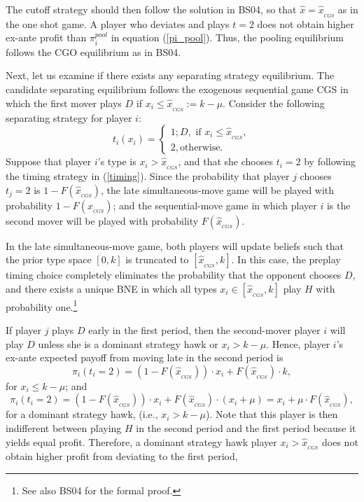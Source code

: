 \documentclass[12pt, letterpaper]{article}
\theoremstyle{plain}
\begin{document}
The cutoff strategy should then follow the solution in BS04, so that $\hat{x}=\hat{x}_{_{CG0}}$ as in the one shot game. A player who deviates and plays $t=2$ does not obtain higher ex-ante profit than $\pi^{pool}_{i}$  in equation (\ref{pi_pool}). Thus, the pooling equilibrium follows the CGO equilibrium as in BS04. 

Next, let us examine if there exists any separating strategy equilibrium. The candidate separating equilibrium follows the exogenous sequential game CGS in which the first mover plays $D$ if $x_i\leq \hat{x}_{_{CGS}}:= k-\mu$. Consider the following separating strategy for player $i $:
\begin{equation}
 t_i(x_i)=
 \begin{cases} 1; D, \mbox{ if } x_i  \leq \hat{x}_{_{CGS}}, \\
 2,  \text{otherwise}.
 \end{cases}
 \label{timing}
\end{equation}
Suppose that player $i$'s type is $x_i >\hat{x}_{_{CGS}}$, and that she chooses $t_i=2$ by following the timing strategy  in (\ref{timing}).  Since the probability that player $j$ chooses $t_j=2$ is $1-F(\hat{x}_{_{CGS}})$, the late simultaneous-move game will be played with probability $1-F(\hat{x}_{_{CGS}})$; and the sequential-move game in which player $i$ is the second mover will be played with probability $F(\hat{x}_{_{CGS}})$.

In the late simultaneous-move game, both players will update beliefs such that the prior type space $[0, k]$ is truncated to $[\hat{x}_{_{CGS}},k]$. In this case, the preplay timing choice completely eliminates the probability that the opponent chooses $D$, and there exists a unique BNE in which all types $x_i \in [\hat{x}_{_{CGS}},k]$ play $H$ with probability one.\footnote{See also BS04 for the formal proof.} 
 
If player $j$ plays $D$ early in the first period, then the second-mover player $i$ will play $D$ unless she is a dominant strategy hawk or $x_i>k-\mu$. Hence, player $i$'s ex-ante expected payoff from moving late in the second period is
\begin{equation}
\pi_i(t_i=2)=(1-F(\hat{x}_{_{CGS}}))\cdot x_i+F(\hat{x}_{_{CGS}}) \cdot k,
\end{equation}
for $x_i\leq k-\mu$; and
\begin{equation}
\pi_i(t_i=2)=(1-F(\hat{x}_{_{CGS}}))\cdot x_i+F(\hat{x}_{_{CGS}}) \cdot (x_i+\mu)=x_i + \mu\cdot  F(\hat{x}_{_{CGS}}),
\end{equation}for a dominant strategy hawk, (i.e., $x_i> k-\mu$). Note that this player is then indifferent between playing $H$ in the second period and the first period because it yields equal profit. Therefore, a dominant strategy hawk player $x_i>\hat{x}_{_{CGS}}$ does not obtain higher profit from deviating to the first period, 
\end{document}
